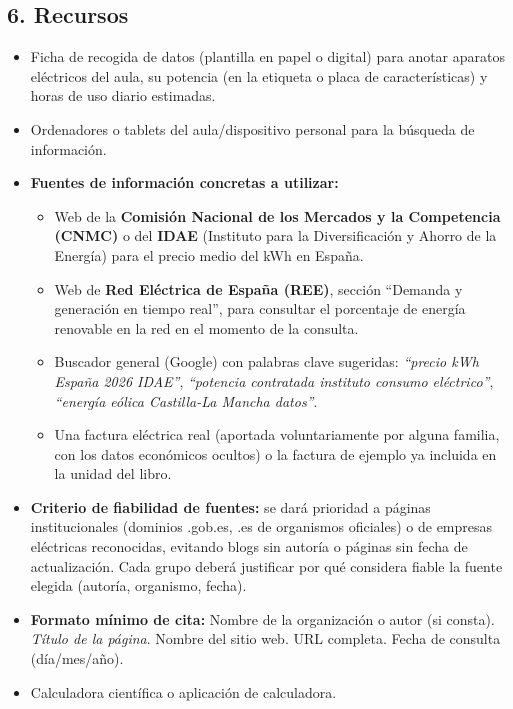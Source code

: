 \documentclass[11pt,a4paper]{article}
\begin{document}
\subsection*{6. Recursos}
\begin{itemize}
    \item Ficha de recogida de datos (plantilla en papel o digital) para anotar aparatos eléctricos del aula, su potencia (en la etiqueta o placa de características) y horas de uso diario estimadas.
    \item Ordenadores o tablets del aula/dispositivo personal para la búsqueda de información.
    \item \textbf{Fuentes de información concretas a utilizar:}
    \begin{itemize}
        \item Web de la \textbf{Comisión Nacional de los Mercados y la Competencia (CNMC)} o del \textbf{IDAE} (Instituto para la Diversificación y Ahorro de la Energía) para el precio medio del kWh en España.
        \item Web de \textbf{Red Eléctrica de España (REE)}, sección ``Demanda y generación en tiempo real'', para consultar el porcentaje de energía renovable en la red en el momento de la consulta.
        \item Buscador general (Google) con palabras clave sugeridas: \textit{``precio kWh España 2026 IDAE''}, \textit{``potencia contratada instituto consumo eléctrico''}, \textit{``energía eólica Castilla-La Mancha datos''}.
        \item Una factura eléctrica real (aportada voluntariamente por alguna familia, con los datos económicos ocultos) o la factura de ejemplo ya incluida en la unidad del libro.
    \end{itemize}
    \item \textbf{Criterio de fiabilidad de fuentes:} se dará prioridad a páginas institucionales (dominios .gob.es, .es de organismos oficiales) o de empresas eléctricas reconocidas, evitando blogs sin autoría o páginas sin fecha de actualización. Cada grupo deberá justificar por qué considera fiable la fuente elegida (autoría, organismo, fecha).
    \item \textbf{Formato mínimo de cita:} Nombre de la organización o autor (si consta). \textit{Título de la página}. Nombre del sitio web. URL completa. Fecha de consulta (día/mes/año).
    \item Calculadora científica o aplicación de calculadora.
\end{itemize}
\end{document}

